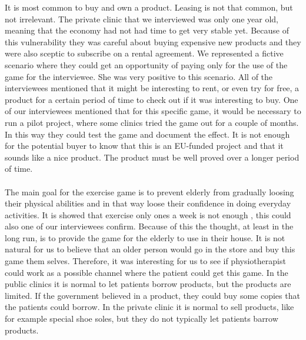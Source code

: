 It is most common to buy and own a product. Leasing is not that common, but not irrelevant. The private clinic that we interviewed was only one year old, meaning that the economy had not had time to get very stable yet. Because of this vulnerability they was careful about buying expensive new products and they were also sceptic to subscribe on a rental agreement. We represented a fictive scenario where they could get an opportunity of paying only for the use of the game for the interviewee. She was very positive to this scenario. All of the interviewees mentioned that it might be interesting to rent, or even try for free, a product for a certain period of time to check out if it was interesting to buy.  One of our interviewees mentioned that for this specific game, it would be necessary to run a pilot project, where some clinics tried the game out for a couple of months. In this way they could test the game and document the effect. It is not enough for the potential buyer to know that this is an EU-funded project and that it sounds like a nice product. The product must be well proved over a longer period of time. \\ \\
The main goal for the exercise game is to prevent elderly from gradually loosing their physical abilities and in that way loose their confidence in doing everyday activities. It is showed that exercise only ones a week is not enough \cite{gruppetrening-trheim}, this could also one of our interviewees confirm.  Because of this the thought, at least in the long run, is to provide the game for the elderly to use in their house. It is not natural for us to believe that an older person would go in the store and buy this game them selves. Therefore, it was interesting for us to see if physiotherapist could work as a possible channel where the patient could get this game. 
In the public clinics it is normal to let patients borrow products, but the products are limited.  If the government believed in a product, they could buy some copies that the patients could borrow. In the private clinic it is normal to sell products, like for example special shoe soles, but they do not typically let patients barrow products. \\ \\

